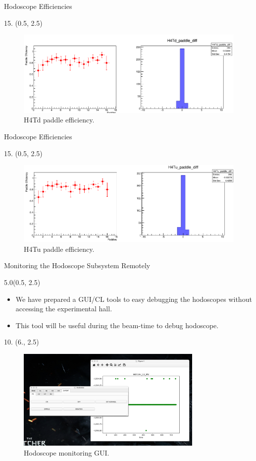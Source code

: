 \documentclass[12pt, xcolor={dvipsnames}, aspectratio = 169, sans,mathserif]{beamer}
\newenvironment{List}[2]
{
\begin{textblock}{#1}#2
\begin{itemize}
}
{
\end{itemize}
\end{textblock}
}
\newenvironment{Pic}[2]
{
\begin{textblock}{#1} #2
\begin{figure}
}
{
\end{figure}
\end{textblock}
}
\begin{document}
\begin{frame}{Hodoscope Efficiencies}
\begin{Pic}{15.}{(0.5, 2.5)}
  \includegraphics[width=15.0cm]{imgs/H4Td_paddle_diff.png}
  \caption{H4Td paddle efficiency.}
\end{Pic}
\end{frame}

\begin{frame}{Hodoscope Efficiencies}
\begin{Pic}{15.}{(0.5, 2.5)}
  \includegraphics[width=15.0cm]{imgs/H4Tu_paddle_diff.png}
  \caption{H4Tu paddle efficiency.}
\end{Pic}
\end{frame}

\begin{frame}[fragile]{Monitoring the Hodoscope Subsystem Remotely}
\begin{List}{5.0}{(0.5, 2.5)}

  \item We have prepared a GUI/CL tools to easy debugging the hodoscopes without accessing the experimental hall.

  \item This tool will be useful during the beam-time to debug hodoscope.

\end{List}

\begin{Pic}{10.}{(6., 2.5)}
  \includegraphics[width=9.0cm]{imgs/hodo_mon.png}
  \caption{Hodoscope monitoring GUI.}
\end{Pic}
\end{frame}
\end{document}
